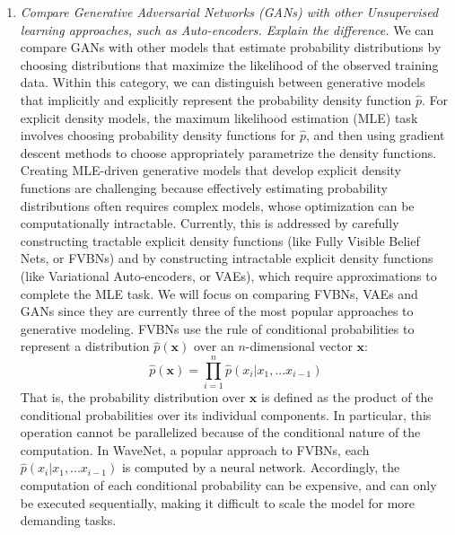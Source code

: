 \documentclass[a4paper]{article}
\begin{document}
\begin{enumerate}
{}
\item{\textit{Compare Generative Adversarial Networks (GANs) with other Unsupervised learning approaches, such as Auto-encoders. Explain the difference.}
\newline
\newline
We can compare GANs with other models that estimate probability distributions by choosing distributions that maximize the likelihood of the observed training data. Within this category, we can distinguish between generative models that implicitly and explicitly represent the probability density function $\hat{p}$. 
\newline
\newline
For explicit density models, the maximum likelihood estimation (MLE) task involves choosing probability density functions for $\hat{p}$, and then using gradient descent methods to choose appropriately parametrize the density functions. Creating MLE-driven generative models that develop explicit density functions are challenging because effectively estimating probability distributions often requires complex models, whose optimization can be computationally intractable. Currently, this is addressed by carefully constructing tractable explicit density functions (like Fully Visible Belief Nets, or FVBNs) and by constructing intractable explicit density functions (like Variational Auto-encoders, or VAEs), which require approximations to complete the MLE task. We will focus on comparing FVBNs, VAEs and GANs since they are currently three of the most popular approaches to generative modeling.
\newline
\newline
FVBNs use the rule of conditional probabilities to represent a distribution $\hat{p} \left( \textbf{x} \right) $ over an $n$-dimensional vector $\textbf{x}$:
$$\hat{p} \left( \textbf{x} \right) = \prod_{i=1}^n \hat{p} \left( x_i | x_1,...x_{i-1} \right) $$
That is, the probability distribution over $\textbf{x}$ is defined as the product of the conditional probabilities over its individual components. In particular, this operation cannot be parallelized because of the conditional nature of the computation. In WaveNet, a popular approach to FVBNs, each $\hat{p} \left( x_i | x_1,...x_{i-1} \right)$ is computed by a neural network. Accordingly, the computation of each conditional probability can be expensive, and can only be executed sequentially, making it difficult to scale the model for more demanding tasks. 
\newline
\newline
}
\end{enumerate}
\end{document}
